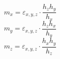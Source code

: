 \documentclass[12pt]{article}
\begin{document}
\begin{displaymath}
m_{x}=\varepsilon_{x,y,z}\cdot \frac{h_{z}h_{y}}{h_{x}}
\end{displaymath}
\begin{displaymath}
m_{y}=\varepsilon_{x,y,z}\cdot \frac{h_{z}h_{x}}{h_{y}}
\end{displaymath}
\begin{displaymath}
m_{z}=\varepsilon_{x,y,z}\cdot \frac{h_{x}h_{y}}{h_{z}}
\end{displaymath}
\end{document}
